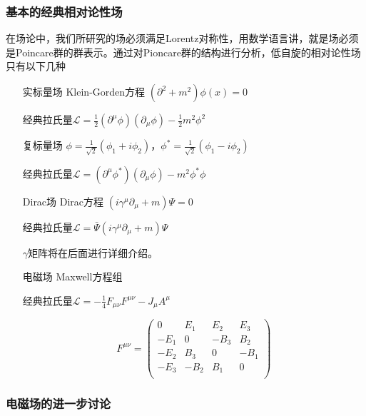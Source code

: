\subsubsection{基本的经典相对论性场}

在场论中，我们所研究的场必须满足Lorentz对称性，用数学语言讲，就是场必须是Poincare群的群表示。通过对Pioncare群的结构进行分析，低自旋的相对论性场只有以下几种

\begin{itemize}
    \item[实标量场] Klein-Gorden方程 $(\partial^2+m^2)\phi(x)=0$

        经典拉氏量$\mathcal{L}=\frac{1}{2}(\partial^\mu\phi)(\partial_\mu\phi)-\frac{1}{2}m^2\phi^2$

    \item[复标量场] $\phi=\frac{1}{\sqrt{2}}(\phi_1+i\phi_2)$，$\phi^*=\frac{1}{\sqrt{2}}(\phi_1-i\phi_2)$
        
        经典拉氏量$\mathcal{L}=(\partial^\mu\phi^*)(\partial_\mu\phi)-m^2\phi^*\phi$
        
    \item[Dirac场] Dirac方程 $(i\gamma^\mu\partial_\mu+m)\Psi=0$
    
        经典拉氏量$\mathcal{L}=\bar{\Psi}(i\gamma^\mu\partial_\mu+m)\Psi$

        $\gamma$矩阵将在后面进行详细介绍。

    \item[电磁场] Maxwell方程组
    
        经典拉氏量$\mathcal{L}=-\frac{1}{4}F_{\mu\nu}F^{\mu\nu}-J_\mu A^\mu$
        
        \begin{equation}
            F^{\mu\nu}=\left(\begin{matrix}
                0 & E_1 & E_2 & E_3 \\
                -E_1 & 0 & -B_3 & B_2 \\
                -E_2 & B_3 & 0 & -B_1 \\
                -E_3 & -B_2 & B_1 & 0 \\
            \end{matrix}\right)
        \end{equation}

\end{itemize}

\subsubsection{电磁场的进一步讨论}

